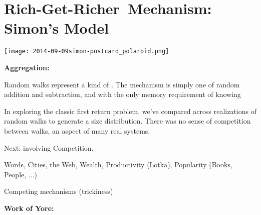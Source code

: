 


%
%




\section{Rich-Get-Richer\ Mechanism: Simon's Model}


  \texttt{[image: 2014-09-09simon-postcard\_polaroid.png]}

  \textbf{Aggregation:}
     
      Random walks represent a kind of .
      The mechanism is simply one of random addition and subtraction,
      and with the only memory requirement of knowing 
     
      In exploring the classic first return problem, we've compared across
      realizations of random walks to generate a size distribution.
      There was no sense of competition between walks, an aspect of
      many real systems.
     
      Next: 
      involving Competition.
     
       Words, Cities, the Web, Wealth, Productivity (Lotka), Popularity (Books, People, ...) 
     
      Competing mechanisms (trickiness)
    
  



  \textbf{Work of Yore:}

